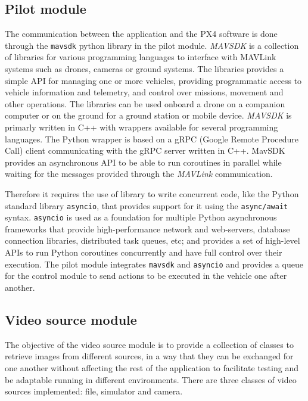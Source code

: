 \subsection{Pilot module}

The communication between the application and the PX4 software is done through the \verb|mavsdk| python library in the pilot module.
\emph{MAVSDK} is a collection of libraries for various programming languages to interface with MAVLink systems such as drones, cameras or ground systems.
The libraries provides a simple API for managing one or more vehicles, providing programmatic access to vehicle information and telemetry, and control over missions, movement and other operations.
The libraries can be used onboard a drone on a companion computer or on the ground for a ground station or mobile device.
\emph{MAVSDK} is primarly written in C++ with wrappers available for several programming languages.
The Python wrapper is based on a gRPC (Google Remote Procedure Call) client communicating with the gRPC server written in C++.
MavSDK provides an asynchronous API to be able to run coroutines in parallel while waiting for the messages provided through the \emph{MAVLink} communication.

Therefore it requires the use of library to write concurrent code, like the Python standard library \verb|asyncio|, 
that provides support for it using the \verb|async/await| syntax.
\verb|asyncio| is used as a foundation for multiple Python asynchronous frameworks that provide high-performance network and web-servers, database connection libraries, distributed task queues, etc; 
and provides a set of high-level APIs to run Python coroutines concurrently and have full control over their execution.
The pilot module integrates \verb|mavsdk| and \verb|asyncio| and provides a queue for the control module to send actions to be executed in the vehicle one after another.

\subsection{Video source module}

The objective of the video source module is to provide a collection of classes to retrieve images from different sources,
in a way that they can be exchanged for one another without affecting the rest of the application to facilitate testing and be adaptable running in different environments.
There are three classes of video sources implemented: file, simulator and camera.

